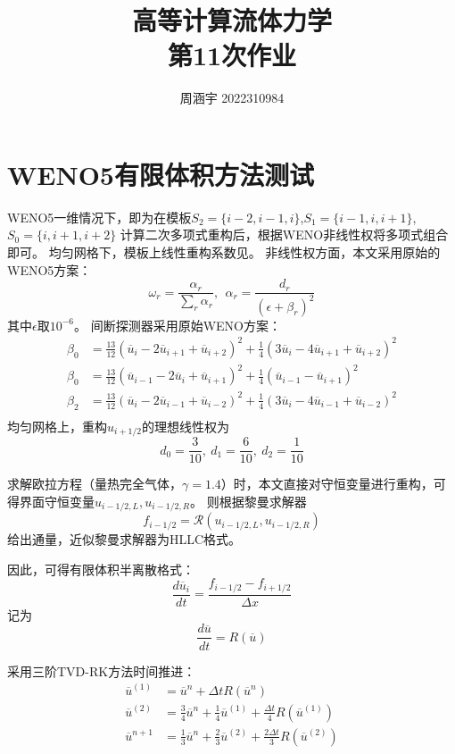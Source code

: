 \documentclass[UTF8,zihao=5]{ctexart} %
\title{{\bfseries\rmfamily\Huge{高等计算流体力学\hspace{1em}\\第11次作业}}}
\author{周涵宇 2022310984}
\date{}
\newcommand*{\inc}[0]{{\Delta}}
\newcommand*{\mean}[1]{\overline{#1}}
\begin{document}
\maketitle

\section{WENO5有限体积方法测试}

WENO5一维情况下，即为在模板$S_2=\{i-2,i-1,i\}$,$S_1=\{i-1,i,i+1\}$,$S_0=\{i,i+1,i+2\}$
计算二次多项式重构后，根据WENO非线性权将多项式组合即可。
均匀网格下，模板上线性重构系数见\cite{cockburn1998essentially}。
非线性权方面，本文采用原始的WENO5方案：
$$
    \omega_r = \frac{\alpha_r}{\sum_r{\alpha_r}},\ \ \alpha_r = \frac{d_r}{(\epsilon+\beta_r)^2}
$$
其中$\epsilon$取$10^{-6}$。
间断探测器采用原始WENO方案\cite{cockburn1998essentially}：
$$
    \begin{aligned}
        \beta_0 & =
        \frac{13}{12}(\mean{u}_{i}-2\mean{u}_{i+1}+\mean{u}_{i+2})^2 +
        \frac{1}{4}(3\mean{u}_{i}-4\mean{u}_{i+1}+\mean{u}_{i+2})^2 \\
        \beta_0 & =
        \frac{13}{12}(\mean{u}_{i-1}-2\mean{u}_{i}+\mean{u}_{i+1})^2 +
        \frac{1}{4}(\mean{u}_{i-1}-\mean{u}_{i+1})^2                \\
        \beta_2 & =
        \frac{13}{12}(\mean{u}_{i}-2\mean{u}_{i-1}+\mean{u}_{i-2})^2 +
        \frac{1}{4}(3\mean{u}_{i}-4\mean{u}_{i-1}+\mean{u}_{i-2})^2 \\
    \end{aligned}
$$
均匀网格上，重构$u_{i+1/2}$的理想线性权为
$$
    d_0 = \frac{3}{10},\ d_1=\frac{6}{10},\ d_2 = \frac{1}{10}
$$

求解欧拉方程（量热完全气体，$\gamma=1.4$）时，本文直接对守恒变量进行重构，可得界面守恒变量$u_{i-1/2,L},u_{i-1/2,R}$。
则根据黎曼求解器
$$
    f_{i-1/2} = \mathcal{R}(u_{i-1/2,L},u_{i-1/2,R})
$$
给出通量，近似黎曼求解器为HLLC格式\cite{2013Riemann}。

因此，可得有限体积半离散格式：
$$
    \frac{d \overline{u}_i }{dt} = \frac{f_{i-1/2} - f_{i+1/2}}{\inc x}
$$
记为
$$
    \frac{d \overline{u}}{dt} = R(\overline{u})
$$

采用三阶TVD-RK方法\cite{gottlieb1998total}时间推进：
$$
    \begin{aligned}
        \overline{u}^{(1)} & = \overline{u}^n + {\inc t} R(\overline{u}^n)                                                        \\
        \overline{u}^{(2)} & = \frac{3}{4}\overline{u}^n +\frac{1}{4}\overline{u}^{(1)} + \frac{\inc t}{4} R(\overline{u}^{(1)})  \\
        \overline{u}^{n+1} & = \frac{1}{3}\overline{u}^n +\frac{2}{3}\overline{u}^{(2)} + \frac{2\inc t}{3} R(\overline{u}^{(2)}) \\
    \end{aligned}
$$
\end{document}
